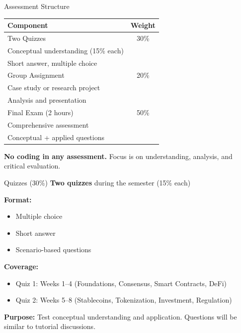 \documentclass[10pt]{beamer}
\begin{document}
\begin{frame}{Assessment Structure}
  \begin{center}
  \begin{tabular}{lc}
    \toprule
    \textbf{Component} & \textbf{Weight} \\
    \midrule
    Two Quizzes & 30\% \\
    \quad Conceptual understanding (15\% each) & \\
    \quad Short answer, multiple choice & \\
    \addlinespace
    Group Assignment & 20\% \\
    \quad Case study or research project & \\
    \quad Analysis and presentation & \\
    \addlinespace
    Final Exam (2 hours) & 50\% \\
    \quad Comprehensive assessment & \\
    \quad Conceptual + applied questions & \\
    \bottomrule
  \end{tabular}
  \end{center}
  
  \vspace{1em}
  \textbf{No coding in any assessment.} Focus is on understanding, analysis, and critical evaluation.
\end{frame}

\begin{frame}{Quizzes (30\%)}
  \textbf{Two quizzes} during the semester (15\% each)
  
  \vspace{1em}
  \textbf{Format:}
  \begin{itemize}
    \item Multiple choice
    \item Short answer
    \item Scenario-based questions
  \end{itemize}
  
  \vspace{1em}
  \textbf{Coverage:}
  \begin{itemize}
    \item Quiz 1: Weeks 1--4 (Foundations, Consensus, Smart Contracts, DeFi)
    \item Quiz 2: Weeks 5--8 (Stablecoins, Tokenization, Investment, Regulation)
  \end{itemize}
  
  \vspace{1em}
  \textbf{Purpose:} Test conceptual understanding and application. Questions will be similar to tutorial discussions.
\end{frame}
\end{document}
